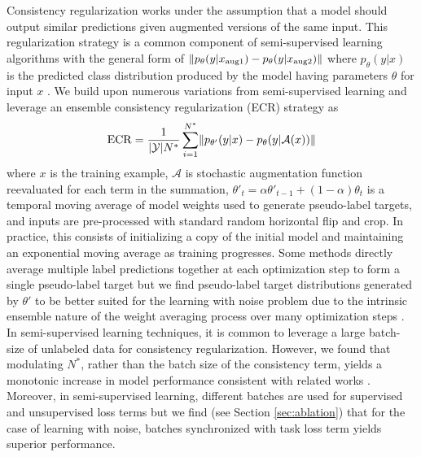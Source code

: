 \documentclass{article}
\DeclarePairedDelimiter{\norm}{\lVert}{\rVert}
\DeclareMathOperator{\ECR}{ECR}
\begin{document}
Consistency regularization works under the assumption that a model should output similar predictions given augmented versions of the same input. This regularization strategy is a common component of semi-supervised learning algorithms with the general form of $\norm{p_\theta(y\vert x_\text{aug1}) - p_\theta(y\vert x_\text{aug2})}$ where $p_\theta(y\vert x)$ is the predicted class distribution produced by the model having parameters $\theta$ for input $x$ \cite{7780854, sajjadi2016}.  We build upon numerous variations from semi-supervised learning \cite{laine2017, tarvainen2017, 48557, Berthelot2020ReMixMatch:} and leverage an ensemble consistency regularization (ECR) strategy as
\begin{equation}
\label{eqn:meanteacher}
\ECR = \frac{1}{\vert \mathcal{Y} \vert N^*}\sum_{i=1}^{N^*}\norm{p_{\theta'}(y\vert x) - p_\theta(y\vert \mathcal{A}(x))}
\end{equation}
where $x$ is the training example, $\mathcal{A}$ is stochastic augmentation function reevaluated for each term in the summation, $\theta'_{t} = \alpha \theta'_{t-1} + (1-\alpha)\theta_t$ is a temporal moving average of model weights used to generate pseudo-label targets, and inputs are pre-processed with standard random horizontal flip and crop.  In practice, this consists of initializing a copy of the initial model and maintaining an exponential moving average as training progresses.  Some methods directly average multiple label predictions together at each optimization step to form a single pseudo-label target \cite{48557,li2020} but we find pseudo-label target distributions generated by $\theta'$ to be better suited for the learning with noise problem due to the intrinsic ensemble nature of the weight averaging process over many optimization steps \cite{tarvainen2017}.  In semi-supervised learning techniques, it is common to leverage a large batch-size of unlabeled data for consistency regularization.  However, we found that modulating $N^*$, rather than the batch size of the consistency term, yields a monotonic increase in model performance consistent with related works \cite{Berthelot2020ReMixMatch:}.  Moreover, in semi-supervised learning, different batches are used for supervised and unsupervised loss terms but we find (see Section \ref{sec:ablation}) that for the case of learning with noise, batches synchronized with task loss term yields superior performance. 
\end{document}
